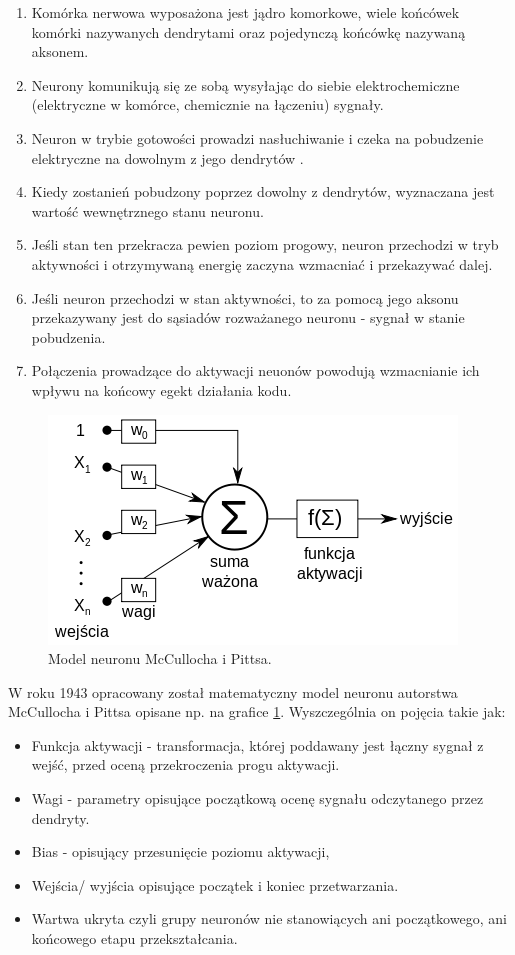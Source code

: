 \documentclass[10pt,a4paper]{book}
\begin{document}
\begin{enumerate}
\item Komórka nerwowa wyposażona jest jądro komorkowe, wiele końcówek komórki nazywanych dendrytami oraz pojedynczą końcówkę nazywaną aksonem.
\item Neurony komunikują się ze sobą wysyłając do siebie elektrochemiczne (elektryczne w komórce, chemicznie na łączeniu) sygnały.
\item Neuron w trybie gotowości prowadzi nasłuchiwanie i czeka na pobudzenie elektryczne na dowolnym z jego dendrytów . 
\item Kiedy zostanień pobudzony poprzez dowolny z dendrytów, wyznaczana jest wartość wewnętrznego stanu neuronu.
\item Jeśli stan ten przekracza pewien poziom progowy, neuron przechodzi w tryb aktywności i otrzymywaną energię zaczyna wzmacniać i przekazywać dalej.
\item Jeśli neuron przechodzi w stan aktywności, to za pomocą jego aksonu przekazywany jest do sąsiadów rozważanego neuronu - sygnał w stanie pobudzenia.
\item Połączenia prowadzące do aktywacji neuonów powodują wzmacnianie ich wpływu na końcowy egekt działania kodu.
\end{enumerate}

\begin{figure}
\centering 
\includegraphics[scale=0.5]{images/model_neuronu.png}
\caption{Model neuronu McCullocha i Pittsa.} \label{fig.chapter.predictions.neuron.model}
\end{figure}

W roku 1943 opracowany został matematyczny model neuronu autorstwa  McCullocha i Pittsa opisane np. na grafice \ref{fig.chapter.predictions.neuron.model}. Wyszczególnia on pojęcia takie jak:
\begin{itemize}
\item Funkcja aktywacji - transformacja, której poddawany jest łączny sygnał z wejść, przed oceną przekroczenia progu aktywacji.  
\item Wagi - parametry opisujące początkową ocenę sygnału odczytanego przez dendryty.
\item Bias - opisujący przesunięcie poziomu aktywacji,
\item Wejścia/ wyjścia opisujące początek i koniec przetwarzania.
\item Wartwa ukryta czyli grupy neuronów nie stanowiących ani początkowego, ani końcowego etapu przekształcania. 
\end{itemize}
\end{document}
